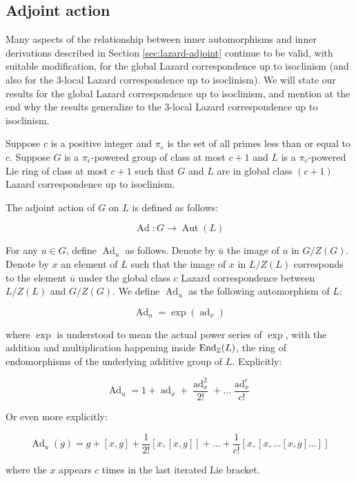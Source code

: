 \subsection{Adjoint action}\label{sec:lcuti-adjoint}

Many aspects of the relationship between inner automorphisms and inner
derivations described in Section \ref{sec:lazard-adjoint} continue to
be valid, with suitable modification, for the global Lazard
correspondence up to isoclinism (and also for the $3$-local Lazard
correspondence up to isoclinism). We will state our results for the
global Lazard correspondence up to isoclinism, and mention at the end
why the results generalize to the $3$-local Lazard correspondence up
to isoclinism.

Suppose $c$ is a positive integer and $\pi_c$ is the set of all primes
less than or equal to $c$. Suppose $G$ is a $\pi_c$-powered group of
class at most $c + 1$ and $L$ is a $\pi_c$-powered Lie ring of class
at most $c + 1$ such that $G$ and $L$ are in global class $(c + 1)$
Lazard correspondence up to isoclinism.

The adjoint action of $G$ on $L$ is defined as follows:

$$\operatorname{Ad}: G \to \operatorname{Aut}(L)$$

For any $u \in G$, define $\operatorname{Ad}_u$ as follows. Denote by
$\overline{u}$ the image of $u$ in $G/Z(G)$. Denote by $x$ an element
of $L$ such that the image of $x$ in $L/Z(L)$ corresponds to the
element $\overline{u}$ under the global class $c$ Lazard
correspondence between $L/Z(L)$ and $G/Z(G)$. We define
$\operatorname{Ad}_u$ as the following automorphism of $L$:

$$\operatorname{Ad}_u = \exp(\operatorname{ad}_x)$$

where $\exp$ is understood to mean the actual power series of $\exp$,
with the addition and multiplication happening inside
$\operatorname{End}_{\mathbb{Z}}(L)$, the ring of endomorphisms of the
underlying additive group of $L$. Explicitly:

$$\operatorname{Ad}_u = 1 + \operatorname{ad}_x + \frac{\operatorname{ad}_x^2}{2!} + \dots \frac{\operatorname{ad}_x^c}{c!}$$

Or even more explicitly:

$$\operatorname{Ad}_u(g) = g + [x,g] + \frac{1}{2!}[x,[x,g]] + \dots + \frac{1}{c!}[x,[x,\dots[x,g]\dots]]$$

where the $x$ appears $c$ times in the last iterated Lie bracket.

